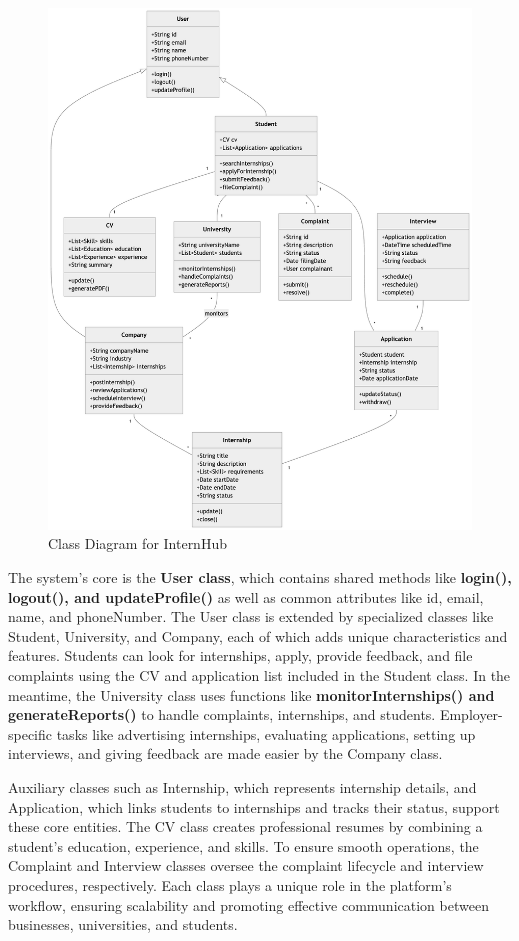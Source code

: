 \begin{figure}[H]
    \begin{center}
        \includegraphics[width=0.9\linewidth]{JhaBhatiaSharma/Images/InternHubClassDiagram.png}
        \caption{Class Diagram for InternHub}
        \label{fig:UML}%
    \end{center}
\end{figure}

The system's core is the \textbf{User class}, which contains shared methods like \textbf{login(), logout(), and updateProfile()} as well as common attributes like id, email, name, and phoneNumber. The User class is extended by specialized classes like Student, University, and Company, each of which adds unique characteristics and features. Students can look for internships, apply, provide feedback, and file complaints using the CV and application list included in the Student class. In the meantime, the University class uses functions like \textbf{monitorInternships() and generateReports()} to handle complaints, internships, and students. Employer-specific tasks like advertising internships, evaluating applications, setting up interviews, and giving feedback are made easier by the Company class.
\par
Auxiliary classes such as Internship, which represents internship details, and Application, which links students to internships and tracks their status, support these core entities. The CV class creates professional resumes by combining a student's education, experience, and skills. To ensure smooth operations, the Complaint and Interview classes oversee the complaint lifecycle and interview procedures, respectively. Each class plays a unique role in the platform's workflow, ensuring scalability and promoting effective communication between businesses, universities, and students.



